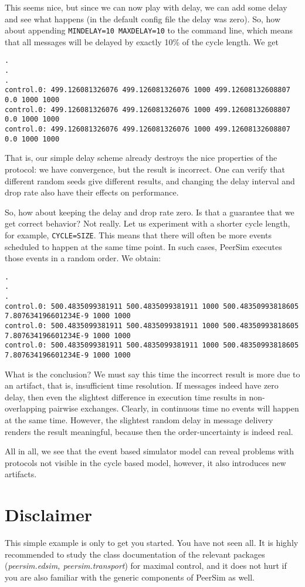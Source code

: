 \documentclass[a4paper,11pt]{article}
\begin{document}
This seems nice, but since we can now play with delay, we can add some
delay and see what happens (in the default config file the delay was zero).
So, how about appending \texttt{MINDELAY=10 MAXDELAY=10} to the command line,
which means that all messages will be delayed by exactly 10\% of the cycle
length.
We get

\scriptsize
\begin{verbatim}
.
.
.
control.0: 499.126081326076 499.126081326076 1000 499.12608132608807 0.0 1000 1000
control.0: 499.126081326076 499.126081326076 1000 499.12608132608807 0.0 1000 1000
control.0: 499.126081326076 499.126081326076 1000 499.12608132608807 0.0 1000 1000
\end{verbatim}
\normalsize

That is, our simple delay scheme already destroys the nice properties of
the protocol: we have convergence, but the result is incorrect.
One can verify that different random seeds give different results, and
changing the delay interval and drop rate also have their effects on
performance.

So, how about keeping the delay and drop rate zero.
Is that a guarantee that we get correct behavior?
Not really.
Let us experiment with a shorter cycle length, for example,
\texttt{CYCLE=SIZE}.
This means that there will often be more events scheduled to happen at the
same time point.
In such cases, PeerSim executes those events in a random order.
We obtain:

\scriptsize
\begin{verbatim}
.
.
.
control.0: 500.4835099381911 500.4835099381911 1000 500.48350993818605 7.807634196601234E-9 1000 1000
control.0: 500.4835099381911 500.4835099381911 1000 500.48350993818605 7.807634196601234E-9 1000 1000
control.0: 500.4835099381911 500.4835099381911 1000 500.48350993818605 7.807634196601234E-9 1000 1000
\end{verbatim}
\normalsize

What is the conclusion?
We must say this time the incorrect result is more due to an artifact, that is,
insufficient time resolution.
If messages indeed have zero delay, then even the slightest difference in
execution time results in non-overlapping pairwise exchanges.
Clearly, in continuous time no events will happen at the same time.
However, the slightest random delay in message delivery renders the result
meaningful, because then the order-uncertainty is indeed real.

All in all, we see that the event based simulator model can reveal problems
with protocols not visible in the cycle based model, however, it also
introduces new artifacts.

\section{Disclaimer}

This simple example is only to get you started.
You have not seen all.
It is highly recommended to study the class documentation of the relevant
packages (\emph{peersim.edsim, peersim.transport}) for maximal control,
and it does not hurt if you are also familiar with the generic components
of PeerSim as well.
\end{document}
